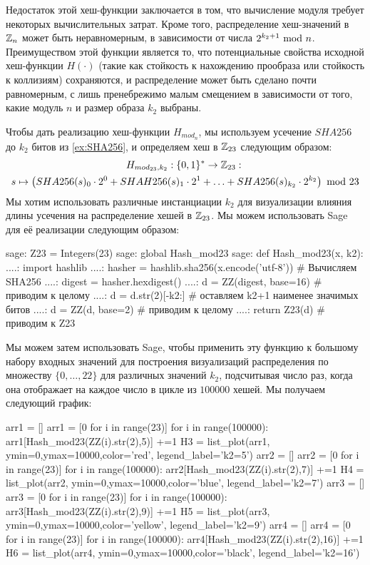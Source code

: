 Недостаток этой хеш-функции заключается в том, что вычисление модуля требует некоторых вычислительных затрат. Кроме того, распределение хеш-значений в $\mathbb{Z}_n$ может быть неравномерным, в зависимости от числа $2^{k_2+1} \text{ mod } n$. Преимуществом этой функции является то, что потенциальные свойства исходной хеш-функции $H(\cdot)$ (такие как стойкость к нахождению прообраза или стойкость к коллизиям) сохраняются, и распределение может быть сделано почти равномерным, с лишь пренебрежимо малым смещением в зависимости от того, какие модуль $n$ и размер образа $k_2$ выбраны.
\begin{example} Чтобы дать реализацию хеш-функции $H_{mod_n}$, мы используем усечение $SHA256$ до $k_2$ битов из \examplename{} \ref{ex:SHA256}, и определяем хеш в $\mathbb{Z}_{23}$ следующим образом:
\begin{multline*}
H_{mod_{23},k_2}: \{0,1\}^* \to \mathbb{Z}_{23}:\; \\
s\mapsto
\left(SHA256(s)_0\cdot 2^0 + SHAH256(s)_1\cdot 2^1 + \ldots + SHA256(s)_{k_2}\cdot 2^{k_2}\right) \text{ mod } 23
\end{multline*}
Мы хотим использовать различные инстанциации $k_2$ для визуализации влияния длины усечения на распределение хешей в $\mathbb{Z}_{23}$. Мы можем использовать Sage для её реализации следующим образом:
\begin{sagecommandline}
sage: Z23 = Integers(23)
sage: global Hash_mod23
sage: def Hash_mod23(x, k2):
....:     import hashlib
....:     hasher = hashlib.sha256(x.encode('utf-8')) # Вычисляем SHA256
....:     digest = hasher.hexdigest()
....:     d = ZZ(digest, base=16) # приводим к целому
....:     d = d.str(2)[-k2:] # оставляем k2+1 наименее значимых битов
....:     d = ZZ(d, base=2) # приводим к целому
....:     return Z23(d) # приводим к Z23
\end{sagecommandline}

Мы можем затем использовать Sage, чтобы применить эту функцию к большому набору входных значений для построения визуализаций распределения по множеству $\{0,\ldots,22\}$ для различных значений $k_2$, подсчитывая число раз, когда она отображает на каждое число в цикле из $100000$ хешей. Мы получаем следующий график:
\begin{sagesilent}
arr1 = []
arr1 = [0 for i in range(23)]
for i in range(100000):
    arr1[Hash_mod23(ZZ(i).str(2),5)] +=1
H3 = list_plot(arr1, ymin=0,ymax=10000,color='red', legend_label='k2=5')
arr2 = []
arr2 = [0 for i in range(23)]
for i in range(100000):
    arr2[Hash_mod23(ZZ(i).str(2),7)] +=1
H4 = list_plot(arr2, ymin=0,ymax=10000,color='blue', legend_label='k2=7')
arr3 = []
arr3 = [0 for i in range(23)]
for i in range(100000):
    arr3[Hash_mod23(ZZ(i).str(2),9)] +=1
H5 = list_plot(arr3, ymin=0,ymax=10000,color='yellow', legend_label='k2=9')
arr4 = []
arr4 = [0 for i in range(23)]
for i in range(100000):
    arr4[Hash_mod23(ZZ(i).str(2),16)] +=1
H6 = list_plot(arr4, ymin=0,ymax=10000,color='black', legend_label='k2=16')
\end{sagesilent}
\begin{center}
\end{center}
\end{example}

